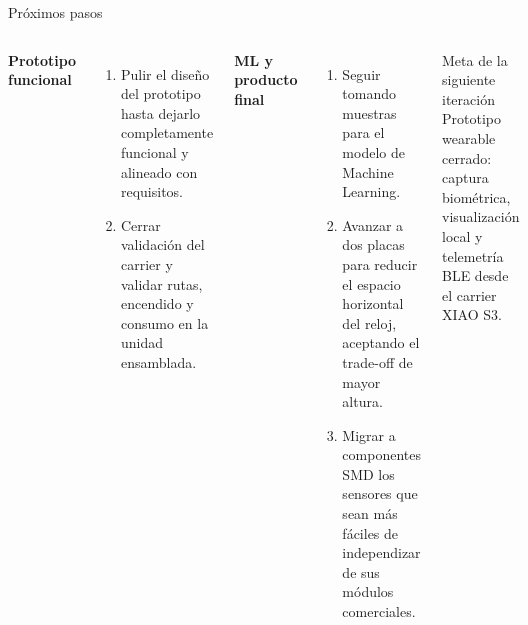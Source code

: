 \documentclass[aspectratio=169, 10pt]{beamer}
\begin{document}
\begin{frame}{Pr\'oximos pasos}
    \begin{columns}[T]
        \scriptsize
        \textbf{Prototipo funcional}
        \begin{enumerate}\itemsep0.08cm
            \item Pulir el dise\~no del prototipo hasta dejarlo completamente funcional y alineado con requisitos.
            \item Cerrar validación del carrier y validar rutas, encendido y consumo en la unidad ensamblada.
        \end{enumerate}
        \scriptsize
        \textbf{ML y producto final}
        \begin{enumerate}\itemsep0.08cm
            \item Seguir tomando muestras para el modelo de Machine Learning.
            \item Avanzar a dos placas para reducir el espacio horizontal del reloj, aceptando el trade-off de mayor altura.
            \item Migrar a componentes SMD los sensores que sean m\'as f\'aciles de independizar de sus m\'odulos comerciales.
        \end{enumerate}
        \vspace{0.2cm}
        \begin{block}{Meta de la siguiente iteraci\'on}
            \scriptsize Prototipo wearable cerrado: captura biom\'etrica, visualizaci\'on local y telemetr\'ia BLE desde el carrier XIAO S3.
        \end{block}
    \end{columns}
\end{frame}
\end{document}
